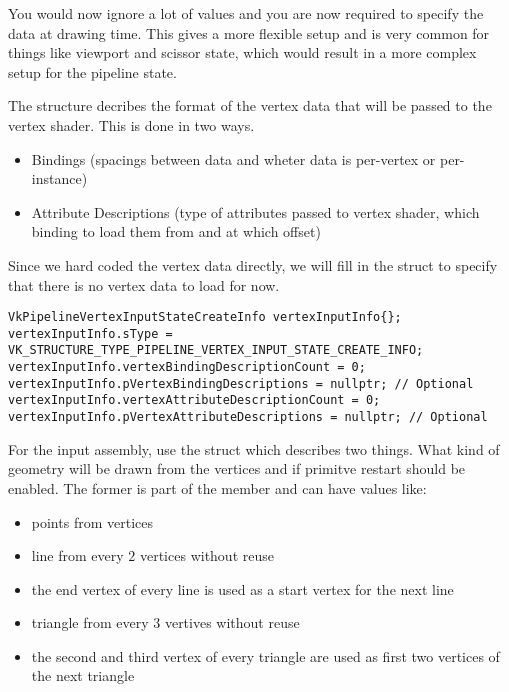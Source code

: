 \par You would now ignore a lot of values and you are now required to specify the data at drawing time. This gives a more flexible setup and is very common for things like viewport and scissor state, which would result in a more complex setup for the pipeline state.

\par The  structure decribes the format of the vertex data that will be passed to the vertex shader. This is done in two ways.
\begin{itemize}
    \item Bindings (spacings between data and wheter data is per-vertex or per-instance)
    \item Attribute Descriptions (type of attributes passed to vertex shader, which binding to load them from and at which offset)
\end{itemize}

\par Since we hard coded the vertex data directly, we will fill in the struct to specify that there is no vertex data to load for now.

\begin{center}
\begin{minipage}{0.95\linewidth}
\begin{lstlisting}
VkPipelineVertexInputStateCreateInfo vertexInputInfo{};
vertexInputInfo.sType = VK_STRUCTURE_TYPE_PIPELINE_VERTEX_INPUT_STATE_CREATE_INFO;
vertexInputInfo.vertexBindingDescriptionCount = 0;
vertexInputInfo.pVertexBindingDescriptions = nullptr; // Optional
vertexInputInfo.vertexAttributeDescriptionCount = 0;
vertexInputInfo.pVertexAttributeDescriptions = nullptr; // Optional
\end{lstlisting}
\end{minipage}
\end{center}

\par For the input assembly, use the  struct which describes two things. What kind of geometry will be drawn from the vertices and if primitve restart should be enabled. The former is part of the  member and can have values like:
\begin{center}
\begin{itemize}
    \item {} points from vertices
    \item {} line from every $2$ vertices without reuse
    \item {} the end vertex of every line is used as a start vertex for the next line
    \item {} triangle from every $3$ vertives without reuse
    \item {} the second and third vertex of every triangle are used as first two vertices of the next triangle
\end{itemize}
\end{center}

